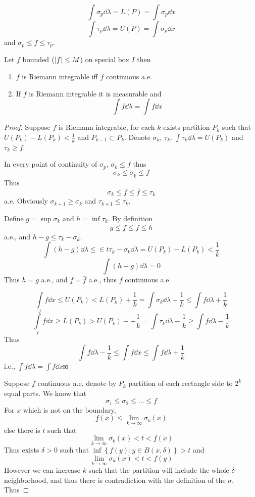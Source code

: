 $$\int \sigma_p \dd{\lambda} = L(P) = \int \sigma_p \dd{x}$$
$$\int \tau_p \dd{\lambda} = U(P) = \int \sigma_p \dd{x}$$
and $\sigma_p \leq f \leq \tau_p$.
\begin{theorem}
	Let $f$ bounded $(\abs{f} \leq M$) on special box $I$ then 
	\begin{enumerate}
		\item $f$ is Riemann integrable iff $f$ continuous a.e.
		\item If $f$ is Riemann integrable it is measurable and 
		$$\int f \dd{\lambda} =  \int f\dd{x}$$
	\end{enumerate}
\begin{proof}
	Suppose $f$ is Riemann integrable, for each $k$ exists partition $P_k$ such that $U(P_k)-L(P_k)< \frac{1}{k}$ and $P_{k-1} \subset P_{k}$. Denote $\sigma_k$, $\tau_k$. $\int \tau_k \dd{\lambda} = U(P_k)$ and $\tau_k\geq f$.
	
	In every point of continuity of $\sigma_p$, $\sigma_k \leq f$ thus
	$$\sigma_k \leq \underline{\sigma}_k \leq \underline{f} $$
	Thus
	$$\sigma_k \leq \underline{f} \leq \bar{f} \leq \tau_k$$
	a.e. Obviously $\sigma_{k+1} \geq \sigma_k$ and $\tau_{k+1} \leq \tau_k$.
	
	Define $g =\sup \sigma_k$ and $h=\inf \tau_k$.  By definition
	$$g \leq \underline{f} \leq \bar{f} \leq h$$
	a.e., and $h-g \leq \tau_k -\sigma_k$.
	$$\int (h-g) \dd{\lambda} \leq \in t\tau_k - \sigma_k \dd{\lambda} = U(P_k) - L(P_k) < \frac{1}{k}$$
	$$\int (h-g) \dd{\lambda} = 0$$
	Thus $h=g$ a.e., and $\underline{f} = \bar{f}$ a.e., thus $f$ continuous a.e.
	
	
	$$\int\limits_I f\dd{x} \leq U(P_k) < L(P_k) + \frac{1}{k} = \int \sigma_k \dd{\lambda} +\frac{1}{k} \leq \int f \dd{\lambda} +\frac{1}{k}$$
	$$\int\limits_I f\dd{x} \geq L(P_k) > U(P_k) -+ \frac{1}{k} = \int \tau_k \dd{\lambda} - \frac{1}{k} \geq \int f \dd{\lambda} -\frac{1}{k}$$
	Thus
	$$\int f \dd{\lambda} -\frac{1}{k} \leq \int f \dd{x} \leq\int f \dd{\lambda} +\frac{1}{k}$$
	i.e., $\int f \dd{\lambda} = \int f \dd{x} $ю
	
	
	Suppose $f$ continuous a.e. denote by $P_k$ partition of each rectangle side to $2^k$ equal parts. We know that
	$$\sigma_1 \leq \sigma_2 \leq \dots \leq f$$
	For $x$ which is not on the boundary,
	$$\underline{f}(x) \leq \lim_{k\to \infty} \sigma_k(x)$$
	else there is $t$ such that
	$$\lim_{k\to \infty} \sigma_k(x)<t<\underline{f}(x)$$
	Thus exists $\delta>0$ such that $\inf\left\{  f(y) : y\in B(x,\delta)   \right\} > t$ and
	$$\lim_{k\to \infty} \sigma_k(x) <t< f(y)$$
	However we can increase $k$ such that the partition will include the whole $\delta$-neighborhood, and thus there is contradiction with the definition of the $\sigma$. Thus 
	

\end{proof}
\end{theorem}
